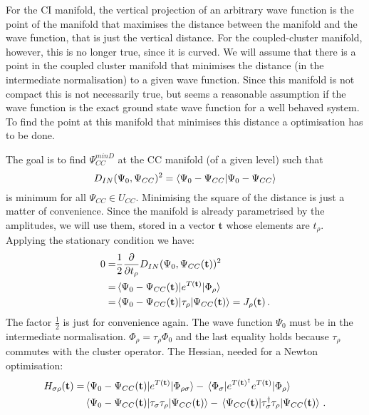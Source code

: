 For the CI manifold, the vertical projection of an arbitrary wave function
is the point of the manifold that maximises the distance between the manifold
and the wave function, that is just the vertical distance.
For the coupled-cluster manifold, however, this is no longer true, since it is curved.
We will assume that there is a point in the coupled cluster manifold that minimises the
distance (in the intermediate normalisation) to a given wave function.
Since this manifold is not compact this is not necessarily true,
but seems a reasonable assumption if the wave function is the exact ground state
wave function for a well behaved system.
To find the point at this manifold that minimises this distance a optimisation has to be done.

The goal is to find $\Psi_{CC}^{minD}$ at the CC manifold (of a given level)
such that
\begin{equation}\label{eq:dist_CC_FCI}
  D_{IN}(\Psi_0, \Psi_{CC})^2 = \braket{\Psi_0 - \Psi_{CC}}{\Psi_0 - \Psi_{CC}}
\end{equation}
is minimum for all $\Psi_{CC} \in U_{CC}$.
Minimising the square of the distance is just a matter of convenience.
Since the manifold is already parametrised by the amplitudes,
we will use them, stored in a vector $\mathbf{t}$ whose elements are $t_\rho$.
Applying the stationary condition we have:
\begin{equation}\label{eq:cc_minD_jac}
  \begin{split}
    0 =& \frac{1}{2} \frac{\partial}{\partial t_\rho} D_{IN}(\Psi_0, \Psi_{CC}(\mathbf{t}))^2\\
    =& \mel{\Psi_0 - \Psi_{CC}(\mathbf{t})}{e^{T(\mathbf{t})}}{\Phi_\rho}\\
    =& \mel{\Psi_0 - \Psi_{CC}(\mathbf{t})}{\tau_\rho}{\Psi_{CC}(\mathbf{t})} = J_\rho(\mathbf{t})\,.
  \end{split}
\end{equation}
The factor $\frac{1}{2}$ is just for convenience again.
The wave function $\Psi_0$ must be in the intermediate normalisation.
$\Phi_\rho = \tau_\rho\Phi_0$ and the last equality holds because $\tau_\rho$ commutes with
the cluster operator.
The Hessian, needed for a Newton optimisation:
\begin{equation}\label{eq:cc_minD_hess}
  \begin{split}
    H_{\sigma\rho}(\mathbf{t}) =
    & \mel{\Psi_0 - \Psi_{CC}(\mathbf{t})}{e^{T(\mathbf{t})}}{\Phi_{\rho\sigma}}
    - \mel{\Phi_\sigma}{e^{T(\mathbf{t})^\dagger}e^{T(\mathbf{t})}}{\Phi_\rho}\\
    & \mel{\Psi_0 - \Psi_{CC}(\mathbf{t})}{\tau_\sigma\tau_\rho}{\Psi_{CC}(\mathbf{t})}
    - \mel{\Psi_{CC}(\mathbf{t})}{\tau_\sigma^\dagger\tau_\rho}{\Psi_{CC}(\mathbf{t})}\,.
  \end{split}
\end{equation}

